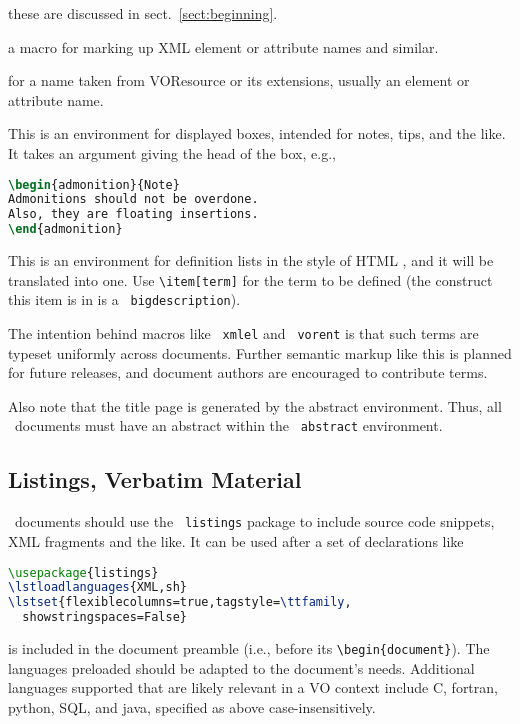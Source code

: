 \documentclass[11pt,a4paper]{ivoa}
\newcommand{\texword}[1]{\texttt{\color{texcolor} #1}}
\begin{document}
\begin{bigdescription}
\item[\texword{author}, \texword{previousversion}] these are discussed
in sect.~\ref{sect:beginning}.
\item[\texword{xmlel}] a macro for marking up XML element or attribute
names and similar.  
\item[\texword{vorent}] for a name taken from VOResource or its
extensions, usually an
element or attribute name.
\item[\texword{admonition}] This is an environment for 
displayed boxes, intended for notes, tips, and the like.  
It takes an argument giving the head of the box, e.g.,

\begin{lstlisting}[language=TeX]
\begin{admonition}{Note}
Admonitions should not be overdone.  
Also, they are floating insertions.
\end{admonition}
\end{lstlisting}
\item[\texword{bigdescription}] This is an environment for definition
lists in the style of HTML , and it will be translated into
one.  Use \verb|\item[term]| for the term to be defined
(the construct this item is in is a \texword{bigdescription}).
\end{bigdescription}

The intention behind macros like \texword{xmlel} and \texword{vorent} is
that such terms are typeset uniformly across documents.  Further
semantic markup like this is planned for future releases, and document
authors are encouraged to contribute terms.

Also note that the title page is generated by the abstract environment.
Thus, all \ivoatex\ documents must have an abstract within the
\texword{abstract} environment.

\subsection{Listings, Verbatim Material}

\ivoatex\ documents should use the \texword{listings} package to include
source code snippets, XML fragments and the like.  It can be used after
a set of declarations like
\begin{lstlisting}[language=TeX]
\usepackage{listings}
\lstloadlanguages{XML,sh}
\lstset{flexiblecolumns=true,tagstyle=\ttfamily,
  showstringspaces=False}
\end{lstlisting}
is included in the document preamble (i.e., before its
\verb|\begin{document}|). The languages preloaded should be adapted to
the document's needs.  Additional
languages supported that are likely relevant in a VO context include C,
fortran, python, SQL, and java, specified as above case-insensitively.
\end{document}
